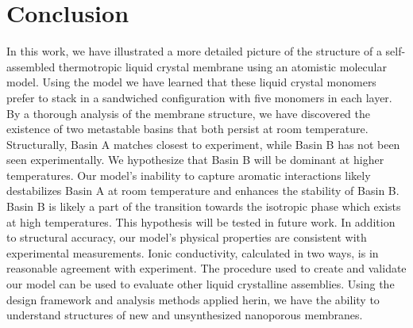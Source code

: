 \section*{Conclusion}

In this work, we have illustrated a more detailed picture of the structure 
of a self-assembled thermotropic liquid crystal membrane using an atomistic 
molecular model. Using the model we have learned that these liquid crystal
monomers prefer to stack in a sandwiched configuration with five monomers
in each layer. By a thorough analysis of the membrane structure, we have
discovered the existence of two metastable basins that both persist at room
temperature. Structurally, Basin A matches closest to experiment, while 
Basin B has not been seen experimentally. We hypothesize that Basin B will
be dominant at higher temperatures. Our model's inability to capture aromatic
interactions likely destabilizes Basin A at room temperature and enhances 
the stability of Basin B. Basin B is likely a part of the transition towards
the isotropic phase which exists at high temperatures. This hypothesis will
be tested in future work. In addition to structural accuracy, our model's
physical properties are consistent with experimental measurements. Ionic
conductivity, calculated
in two ways, is in reasonable agreement with experiment. The procedure used
to create and validate our model can be used to evaluate other liquid 
crystalline assemblies. Using the design framework and analysis methods 
applied herin, we have the ability to understand structures of new and
unsynthesized nanoporous membranes.

